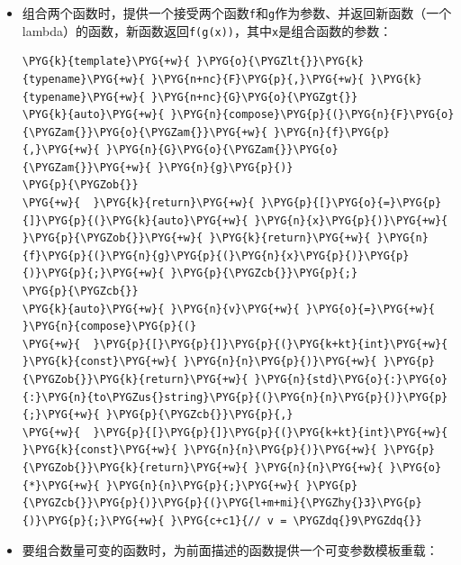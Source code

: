
\begin{itemize}
\item 组合两个函数时，提供一个接受两个函数\texttt{f}和\texttt{g}作为参数、并返回新函数（一个lambda）的函数，新函数返回\texttt{f(\allowbreak{}g(\allowbreak{}x))}，其中\texttt{x}是组合函数的参数：



\begin{codeblockbg}
\begin{Verbatim}[commandchars=\\\{\},breaklines=true,breakanywhere=true,fontsize=\codefont,xleftmargin=17bp]
\PYG{k}{template}\PYG{+w}{ }\PYG{o}{\PYGZlt{}}\PYG{k}{typename}\PYG{+w}{ }\PYG{n+nc}{F}\PYG{p}{,}\PYG{+w}{ }\PYG{k}{typename}\PYG{+w}{ }\PYG{n+nc}{G}\PYG{o}{\PYGZgt{}}
\PYG{k}{auto}\PYG{+w}{ }\PYG{n}{compose}\PYG{p}{(}\PYG{n}{F}\PYG{o}{\PYGZam{}}\PYG{o}{\PYGZam{}}\PYG{+w}{ }\PYG{n}{f}\PYG{p}{,}\PYG{+w}{ }\PYG{n}{G}\PYG{o}{\PYGZam{}}\PYG{o}{\PYGZam{}}\PYG{+w}{ }\PYG{n}{g}\PYG{p}{)}
\PYG{p}{\PYGZob{}}
\PYG{+w}{  }\PYG{k}{return}\PYG{+w}{ }\PYG{p}{[}\PYG{o}{=}\PYG{p}{]}\PYG{p}{(}\PYG{k}{auto}\PYG{+w}{ }\PYG{n}{x}\PYG{p}{)}\PYG{+w}{ }\PYG{p}{\PYGZob{}}\PYG{+w}{ }\PYG{k}{return}\PYG{+w}{ }\PYG{n}{f}\PYG{p}{(}\PYG{n}{g}\PYG{p}{(}\PYG{n}{x}\PYG{p}{)}\PYG{p}{)}\PYG{p}{;}\PYG{+w}{ }\PYG{p}{\PYGZcb{}}\PYG{p}{;}
\PYG{p}{\PYGZcb{}}
\PYG{k}{auto}\PYG{+w}{ }\PYG{n}{v}\PYG{+w}{ }\PYG{o}{=}\PYG{+w}{ }\PYG{n}{compose}\PYG{p}{(}
\PYG{+w}{  }\PYG{p}{[}\PYG{p}{]}\PYG{p}{(}\PYG{k+kt}{int}\PYG{+w}{ }\PYG{k}{const}\PYG{+w}{ }\PYG{n}{n}\PYG{p}{)}\PYG{+w}{ }\PYG{p}{\PYGZob{}}\PYG{k}{return}\PYG{+w}{ }\PYG{n}{std}\PYG{o}{:}\PYG{o}{:}\PYG{n}{to\PYGZus{}string}\PYG{p}{(}\PYG{n}{n}\PYG{p}{)}\PYG{p}{;}\PYG{+w}{ }\PYG{p}{\PYGZcb{}}\PYG{p}{,}
\PYG{+w}{  }\PYG{p}{[}\PYG{p}{]}\PYG{p}{(}\PYG{k+kt}{int}\PYG{+w}{ }\PYG{k}{const}\PYG{+w}{ }\PYG{n}{n}\PYG{p}{)}\PYG{+w}{ }\PYG{p}{\PYGZob{}}\PYG{k}{return}\PYG{+w}{ }\PYG{n}{n}\PYG{+w}{ }\PYG{o}{*}\PYG{+w}{ }\PYG{n}{n}\PYG{p}{;}\PYG{+w}{ }\PYG{p}{\PYGZcb{}}\PYG{p}{)}\PYG{p}{(}\PYG{l+m+mi}{\PYGZhy{}3}\PYG{p}{)}\PYG{p}{;}\PYG{+w}{ }\PYG{c+c1}{// v = \PYGZdq{}9\PYGZdq{}}
\end{Verbatim}
\end{codeblockbg}



\item 要组合数量可变的函数时，为前面描述的函数提供一个可变参数模板重载：




\end{itemize}
